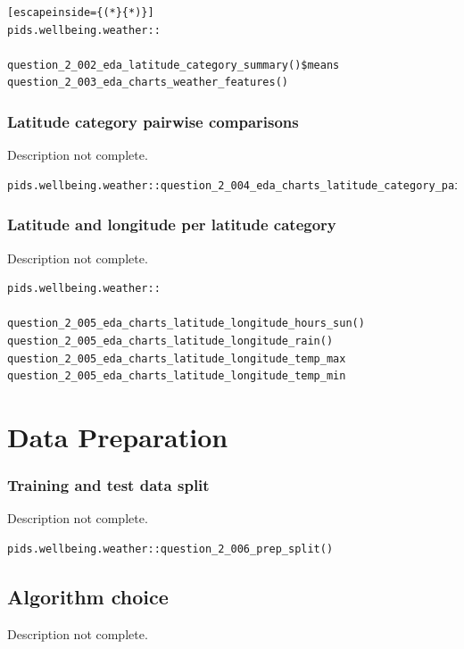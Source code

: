 \documentclass[12pt, oneside, openany]{book}
\begin{document}
\begin{lstlisting}[escapeinside={(*}{*)}]
pids.wellbeing.weather::

question_2_002_eda_latitude_category_summary()$means
question_2_003_eda_charts_weather_features()
\end{lstlisting}

\subsubsection*{Latitude category pairwise comparisons}
\color{red}Description not complete\color{black}.
\bigskip
\begin{lstlisting}
pids.wellbeing.weather::question_2_004_eda_charts_latitude_category_pairwise()
\end{lstlisting}

\subsubsection*{Latitude and longitude per latitude category}
\color{red}Description not complete\color{black}.
\bigskip
\begin{lstlisting}
pids.wellbeing.weather::

question_2_005_eda_charts_latitude_longitude_hours_sun()
question_2_005_eda_charts_latitude_longitude_rain()
question_2_005_eda_charts_latitude_longitude_temp_max
question_2_005_eda_charts_latitude_longitude_temp_min
\end{lstlisting}

\section*{Data Preparation}

\subsubsection*{Training and test data split}
\color{red}Description not complete\color{black}.
\bigskip
\begin{lstlisting}
pids.wellbeing.weather::question_2_006_prep_split()
\end{lstlisting}

\subsection*{Algorithm choice}
\color{red}Description not complete\color{black}.
\end{document}
